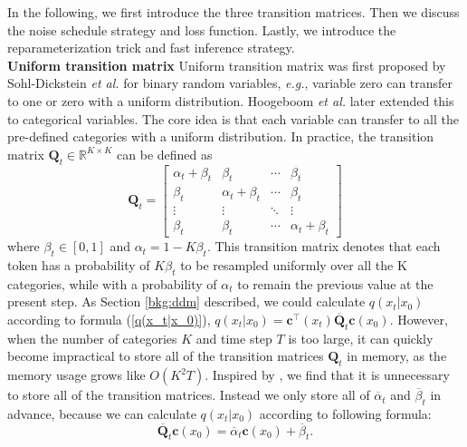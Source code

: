 \documentclass[lettersize,journal]{IEEEtran}
\begin{document}
In the following, we first introduce the three transition matrices. Then we discuss the noise schedule strategy and loss function. Lastly, we introduce the reparameterization trick and fast inference strategy.  \\
\noindent \textbf{Uniform transition matrix} Uniform transition matrix was first proposed by Sohl-Dickstein \textit{et al.} \cite{sohl2015deep} for binary random variables, \textit{e.g.}, variable zero can transfer to one or zero with a uniform distribution. Hoogeboom \textit{et al.} \cite{hoogeboom2021argmax} later extended this to categorical variables. The core idea is that each variable can transfer to all the pre-defined categories with a uniform distribution. In practice, the transition matrix $\boldsymbol{Q}_t \in \mathbb{R}^{K \times K}$ can be defined as
 \begin{equation} \label{uniform transition mat}
 \boldsymbol{Q}_t =
 \begin{bmatrix}
    \alpha_t + \beta_t & \beta_t & \cdots & \beta_t \\
    \beta_t &  \alpha_t + \beta_t & \cdots & \beta_t \\
    \vdots  &   \vdots            &  \ddots  &    \vdots \\
    \beta_t & \beta_t  &  \cdots & \alpha_t + \beta_t
\end{bmatrix}
\end{equation}
where $\beta_t \in [0,1]$ and $\alpha_t=1-K\beta_t$. This transition matrix denotes that each token has a probability of $K\beta_t$ to be resampled uniformly over all the K categories, while with a probability of $\alpha_t$ to remain the previous value at the present step. 
As Section \ref{bkg:ddm} described, we could calculate $q(x_t|x_0)$ according to formula (\ref{q(x_t|x_0)}), $q(x_t|x_0)=\boldsymbol{c}^\top(x_t) \overline{\boldsymbol{Q}}_t \boldsymbol{c}(x_{0})$. However, when the number of categories $K$ and time step $T$ is too large, it can quickly become impractical to store all of the transition matrices $\boldsymbol{Q}_t$ in memory, as the memory usage grows like $O(K^2T)$. Inspired by \cite{gu2021vector}, we find that it is unnecessary to store all of the transition matrices. Instead we only store all of $\overline{\alpha}_t$ and $\overline{\beta}_t$ in advance, because we can calculate $q(x_t|x_0)$ according to following formula:
\begin{equation}\label{formula:quick cal uniform matrix}
   \overline{\boldsymbol{Q}}_t \boldsymbol{c}(x_0) = \overline{\alpha}_t \boldsymbol{c}(x_0) + \overline{\beta}_t.
\end{equation}
\end{document}
